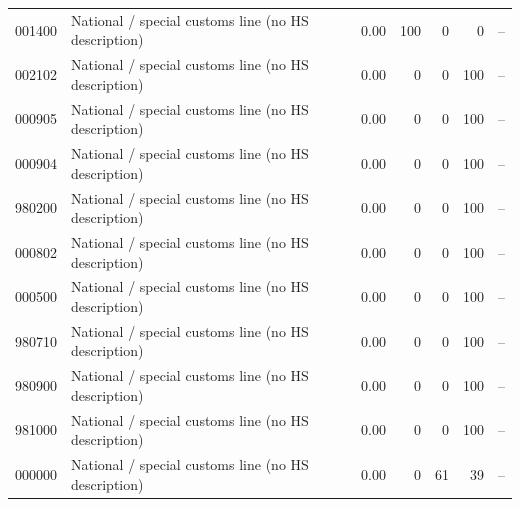 \begin{tabular}{@{}l p{6.4cm} r r r r l@{}}
001400 & National /\allowbreak{} special customs line (no HS description) & 0.00 & 100 & 0 & 0 & -- \\
002102 & National /\allowbreak{} special customs line (no HS description) & 0.00 & 0 & 0 & 100 & -- \\
000905 & National /\allowbreak{} special customs line (no HS description) & 0.00 & 0 & 0 & 100 & -- \\
000904 & National /\allowbreak{} special customs line (no HS description) & 0.00 & 0 & 0 & 100 & -- \\
980200 & National /\allowbreak{} special customs line (no HS description) & 0.00 & 0 & 0 & 100 & -- \\
000802 & National /\allowbreak{} special customs line (no HS description) & 0.00 & 0 & 0 & 100 & -- \\
000500 & National /\allowbreak{} special customs line (no HS description) & 0.00 & 0 & 0 & 100 & -- \\
980710 & National /\allowbreak{} special customs line (no HS description) & 0.00 & 0 & 0 & 100 & -- \\
980900 & National /\allowbreak{} special customs line (no HS description) & 0.00 & 0 & 0 & 100 & -- \\
981000 & National /\allowbreak{} special customs line (no HS description) & 0.00 & 0 & 0 & 100 & -- \\
000000 & National /\allowbreak{} special customs line (no HS description) & 0.00 & 0 & 61 & 39 & -- \\
\bottomrule
\end{tabular}
